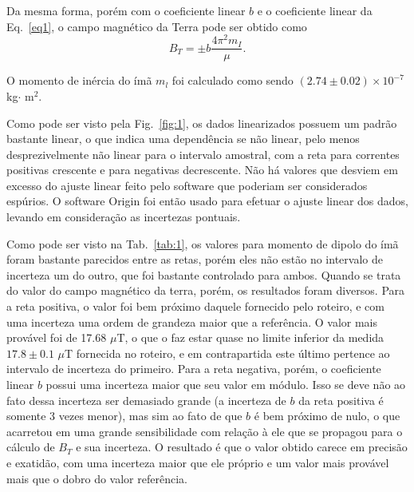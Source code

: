 Da mesma forma, porém com o coeficiente linear $b$ e o coeficiente linear da Eq.~\ref{eq1}, o campo magnético da Terra pode ser obtido como
\begin{equation}
    B_T=\pm b\frac{4 \pi^{2} m_{I}}{ \mu}.
    \label{eq3}
\end{equation}

O momento de inércia do ímã $m_l$ foi calculado como sendo $(2.74\pm 0.02)\times 10^{-7}$ kg$\cdot$ m$^2$.

Como pode ser visto pela Fig.~\ref{fig:1}, os dados linearizados possuem um padrão bastante linear, o que indica uma dependência se não linear, pelo menos desprezivelmente não linear para o intervalo amostral, com a reta para correntes positivas crescente e para negativas decrescente. Não há valores que desviem em excesso do ajuste linear feito pelo software que poderiam ser considerados espúrios. O software Origin foi então usado para efetuar o ajuste linear dos dados, levando em consideração as incertezas pontuais.

Como pode ser visto na Tab.~\ref{tab:1}, os valores para momento de dipolo do ímã foram bastante parecidos entre as retas, porém eles não estão no intervalo de incerteza um do outro, que foi bastante controlado para ambos. Quando se trata do valor do campo magnético da terra, porém, os resultados foram diversos. Para a reta positiva, o valor foi bem próximo daquele fornecido pelo roteiro, e com uma incerteza uma ordem de grandeza maior que a referência. O valor mais provável foi de 17.68 $\mu$T, o que o faz estar quase no limite inferior da medida $17.8 \pm 0.1$ $\mu$T fornecida no roteiro, e em contrapartida este último pertence ao intervalo de incerteza do primeiro. Para a reta negativa, porém, o coeficiente linear $b$ possui uma incerteza maior que seu valor em módulo. Isso se deve não ao fato dessa incerteza ser demasiado grande (a incerteza de $b$ da reta positiva é somente 3 vezes menor), mas sim ao fato de que $b$ é bem próximo de nulo, o que acarretou em uma grande sensibilidade com relação à ele que se propagou para o cálculo de $B_T$  e sua incerteza. O resultado é que o valor obtido carece em precisão e exatidão, com uma incerteza maior que ele próprio e um valor mais provável mais que o dobro do valor referência. 

